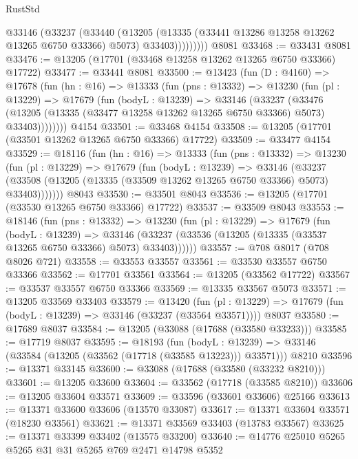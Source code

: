 \begin{lexlean}{RustStd}
\begin{coremodule}
              @33146
                (@33237
                  (@33440
                    (@13205
                      (@13335 (@33441 @13286 @13258 @13262 @13265 @6750 @33366) @5073)
                      @33403)))))))))
    @8081
@33468 := @33431 @8081
@33476 := @13205 (@17701 (@33468 @13258 @13262 @13265 @6750 @33366) @17722)
@33477 := @33441 @8081
@33500 := @13423
    (fun (D : @4160) =>
    @17678
      (fun (hn : @16) =>
      @13333
        (fun (pns : @13332) =>
        @13230
          (fun (pl : @13229) =>
          @17679
            (fun (bodyL : @13239) =>
            @33146
              (@33237
                (@33476
                  (@13205 (@13335 (@33477 @13258 @13262 @13265 @6750 @33366) @5073) @33403))))))))
    @4154
@33501 := @33468 @4154
@33508 := @13205 (@17701 (@33501 @13262 @13265 @6750 @33366) @17722)
@33509 := @33477 @4154
@33529 := @18116
    (fun (hn : @16) =>
    @13333
      (fun (pns : @13332) =>
      @13230
        (fun (pl : @13229) =>
        @17679
          (fun (bodyL : @13239) =>
          @33146
            (@33237 (@33508 (@13205 (@13335 (@33509 @13262 @13265 @6750 @33366) @5073) @33403)))))))
    @8043
@33530 := @33501 @8043
@33536 := @13205 (@17701 (@33530 @13265 @6750 @33366) @17722)
@33537 := @33509 @8043
@33553 := @18146
    (fun (pns : @13332) =>
    @13230
      (fun (pl : @13229) =>
      @17679
        (fun (bodyL : @13239) =>
        @33146 (@33237 (@33536 (@13205 (@13335 (@33537 @13265 @6750 @33366) @5073) @33403))))))
@33557 := @708 @8017 (@708 @8026 @721)
@33558 := @33553 @33557
@33561 := @33530 @33557 @6750 @33366
@33562 := @17701 @33561
@33564 := @13205 (@33562 @17722)
@33567 := @33537 @33557 @6750 @33366
@33569 := @13335 @33567 @5073
@33571 := @13205 @33569 @33403
@33579 := @13420
    (fun (pl : @13229) => @17679 (fun (bodyL : @13239) => @33146 (@33237 (@33564 @33571))))
    @8037
@33580 := @17689 @8037
@33584 := @13205 (@33088 (@17688 (@33580 @33233)))
@33585 := @17719 @8037
@33595 := @18193
    (fun (bodyL : @13239) => @33146 (@33584 (@13205 (@33562 (@17718 (@33585 @13223))) @33571)))
    @8210
@33596 := @13371 @33145
@33600 := @33088 (@17688 (@33580 (@33232 @8210)))
@33601 := @13205 @33600
@33604 := @33562 (@17718 (@33585 @8210))
@33606 := @13205 @33604 @33571
@33609 := @33596 (@33601 @33606) @25166
@33613 := @13371 @33600 @33606 (@13570 @33087)
@33617 := @13371 @33604 @33571 (@18230 @33561)
@33621 := @13371 @33569 @33403 (@13783 @33567)
@33625 := @13371 @33399 @33402 (@13575 @33200)
@33640 := @14776
    @25010
    @5265
    @5265
    @31
    @31
    @5265
    @769
    @2471
    @14798
    @5352

\end{coremodule}
\end{lexlean}

